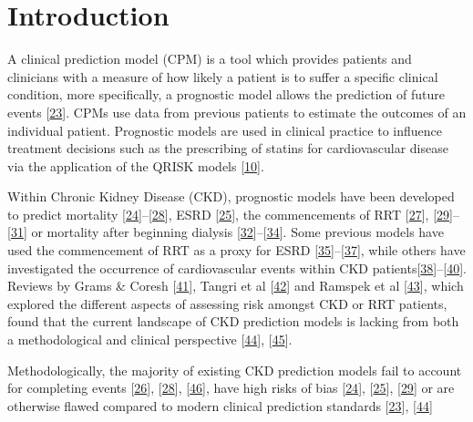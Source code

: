 \documentclass[12pt,PhD,twoside,openright]{muthesis}
\begin{document}
\hypertarget{introduction-7}{%
\section{Introduction}\label{introduction-7}}

A clinical prediction model (CPM) is a tool which provides patients and clinicians with a measure of how likely a patient is to suffer a specific clinical condition, more specifically, a prognostic model allows the prediction of future events {[}\protect\hyperlink{ref-steyerberg_prognosis_2013}{23}{]}. CPMs use data from previous patients to estimate the outcomes of an individual patient. Prognostic models are used in clinical practice to influence treatment decisions such as the prescribing of statins for cardiovascular disease via the application of the QRISK models {[}\protect\hyperlink{ref-hippisley-cox_development_2017}{10}{]}.

Within Chronic Kidney Disease (CKD), prognostic models have been developed to predict mortality {[}\protect\hyperlink{ref-johnson_predicting_2007}{24}{]}--{[}\protect\hyperlink{ref-wick_clinical_2017}{28}{]}, ESRD {[}\protect\hyperlink{ref-landray_prediction_2010}{25}{]}, the commencements of RRT {[}\protect\hyperlink{ref-marks_looking_2015}{27}{]}, {[}\protect\hyperlink{ref-johnson_predicting_2008}{29}{]}--{[}\protect\hyperlink{ref-kulkarni_transition_2017}{31}{]} or mortality after beginning dialysis {[}\protect\hyperlink{ref-floege_development_2015}{32}{]}--{[}\protect\hyperlink{ref-cao_predicting_2015}{34}{]}. Some previous models have used the commencement of RRT as a proxy for ESRD {[}\protect\hyperlink{ref-tangri_predictive_2011}{35}{]}--{[}\protect\hyperlink{ref-tangri_dynamic_2017}{37}{]}, while others have investigated the occurrence of cardiovascular events within CKD patients{[}\protect\hyperlink{ref-shlipak_cardiovascular_2005}{38}{]}--{[}\protect\hyperlink{ref-mcmurray_predictors_2011}{40}{]}. Reviews by Grams \& Coresh {[}\protect\hyperlink{ref-grams_assessing_2013}{41}{]}, Tangri et al {[}\protect\hyperlink{ref-tangri_risk_2013}{42}{]} and Ramspek et al {[}\protect\hyperlink{ref-ramspek_prediction_2017}{43}{]}, which explored the different aspects of assessing risk amongst CKD or RRT patients, found that the current landscape of CKD prediction models is lacking from both a methodological and clinical perspective {[}\protect\hyperlink{ref-collins_transparent_2015}{44}{]}, {[}\protect\hyperlink{ref-bouwmeester_reporting_2012-1}{45}{]}.

Methodologically, the majority of existing CKD prediction models fail to account for completing events {[}\protect\hyperlink{ref-bansal_development_2015}{26}{]}, {[}\protect\hyperlink{ref-wick_clinical_2017}{28}{]}, {[}\protect\hyperlink{ref-perotte_risk_2015}{46}{]}, have high risks of bias {[}\protect\hyperlink{ref-johnson_predicting_2007}{24}{]}, {[}\protect\hyperlink{ref-landray_prediction_2010}{25}{]}, {[}\protect\hyperlink{ref-johnson_predicting_2008}{29}{]} or are otherwise flawed compared to modern clinical prediction standards {[}\protect\hyperlink{ref-steyerberg_prognosis_2013}{23}{]}, {[}\protect\hyperlink{ref-collins_transparent_2015}{44}{]}
\end{document}
